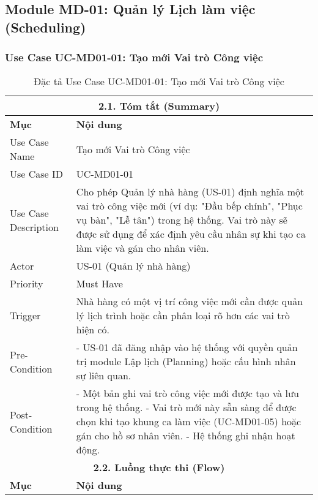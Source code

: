 \subsection{Module MD-01: Quản lý Lịch làm việc (Scheduling)}

\subsubsection{Use Case UC-MD01-01: Tạo mới Vai trò Công việc}

\begin{longtable}{|m{4cm}|p{11cm}|}
\caption{Đặc tả Use Case UC-MD01-01: Tạo mới Vai trò Công việc} \label{tab:uc_md01_01_revised} \\
\hline
\multicolumn{2}{|c|}{\textbf{2.1. Tóm tắt (Summary)}} \\
\hline
\textbf{Mục} & \textbf{Nội dung} \\
\hline
\endhead %
\hline
\endfoot %
\hline
\endlastfoot %
Use Case Name & Tạo mới Vai trò Công việc \\
\hline
Use Case ID & UC-MD01-01 \\
\hline
Use Case Description & Cho phép Quản lý nhà hàng (US-01) định nghĩa một vai trò công việc mới (ví dụ: "Đầu bếp chính", "Phục vụ bàn", "Lễ tân") trong hệ thống. Vai trò này sẽ được sử dụng để xác định yêu cầu nhân sự khi tạo ca làm việc và gán cho nhân viên. \\
\hline
Actor & US-01 (Quản lý nhà hàng) \\
\hline
Priority & Must Have \\
\hline
Trigger & Nhà hàng có một vị trí công việc mới cần được quản lý lịch trình hoặc cần phân loại rõ hơn các vai trò hiện có. \\
\hline
Pre-Condition & - US-01 đã đăng nhập vào hệ thống với quyền quản trị module Lập lịch (Planning) hoặc cấu hình nhân sự liên quan. \\
\hline
Post-Condition & - Một bản ghi vai trò công việc mới được tạo và lưu trong hệ thống. \newline - Vai trò mới này sẵn sàng để được chọn khi tạo khung ca làm việc (UC-MD01-05) hoặc gán cho hồ sơ nhân viên. \newline - Hệ thống ghi nhận hoạt động. \\
\hline
\multicolumn{2}{|c|}{\textbf{2.2. Luồng thực thi (Flow)}} \\
\hline
\textbf{Mục} & \textbf{Nội dung} \\
\hline

\end{longtable}
